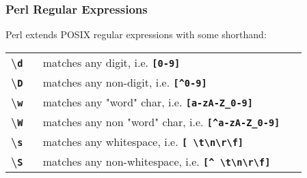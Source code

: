 \begin{frame}
\frametitle{Perl Regular Expressions}
Perl extends {\small POSIX} regular expressions with some shorthand:

\begin{center}
\begin{tabular}{lll}

  \begin{minipage}{1cm}\textbf{{\textbackslash}\tt{d}} ~\end{minipage}
   & \begin{minipage}{18cm}matches any digit, i.e. \textbf{\tt{[0-9]}}~\end{minipage}
\\[1ex]

  \begin{minipage}{1cm}\textbf{{\textbackslash}\tt{D}} ~\end{minipage}
   & \begin{minipage}{18cm}matches any non-digit, i.e. \textbf{\tt{[{\textasciicircum}0-9]}}~\end{minipage}
\\[1ex]

  \begin{minipage}{1cm}\textbf{{\textbackslash}\tt{w}} ~\end{minipage}
   & \begin{minipage}{18cm}matches any "word" char, i.e. \textbf{\tt{[a-zA-Z\_0-9]}}~\end{minipage}
\\[1ex]

  \begin{minipage}{1cm}\textbf{{\textbackslash}\tt{W}} ~\end{minipage}
   & \begin{minipage}{18cm}matches any non "word" char, i.e. \textbf{\tt{[{\textasciicircum}a-zA-Z\_0-9]}}~\end{minipage}
\\[1ex]

  \begin{minipage}{1cm}\textbf{{\textbackslash}\tt{s}} ~\end{minipage}
   & \begin{minipage}{18cm}matches any whitespace, i.e. \textbf{\tt{[ {\textbackslash}t{\textbackslash}n{\textbackslash}r{\textbackslash}f]}}~\end{minipage}
\\[1ex]

  \begin{minipage}{1cm}\textbf{{\textbackslash}\tt{S}} ~\end{minipage}
   & \begin{minipage}{18cm}matches any non-whitespace, i.e. \textbf{\tt{[{\textasciicircum} {\textbackslash}t{\textbackslash}n{\textbackslash}r{\textbackslash}f]}}~\end{minipage}
\\[1ex]
\end{tabular}
\end{center}

\end{frame}

